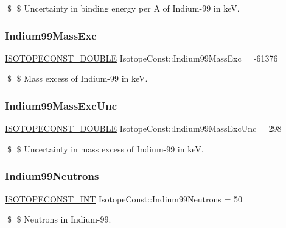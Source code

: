 \$ \$ Uncertainty in binding energy per A of Indium-\/99 in keV. \mbox{\label{group___isotope_const-_indium-_in99_ga57450335f10dbccfe2015ff966a845df}} 
\subsubsection{\texorpdfstring{Indium99\+Mass\+Exc}{Indium99MassExc}}
{\footnotesize\ttfamily \mbox{\hyperlink{group___isotope_const-_macros_ga8f45a7272ce02c0b4c65c44636ed719a}{I\+S\+O\+T\+O\+P\+E\+C\+O\+N\+S\+T\+\_\+\+D\+O\+U\+B\+LE}} Isotope\+Const\+::\+Indium99\+Mass\+Exc = -\/61376}

\$ \$ Mass excess of Indium-\/99 in keV. \mbox{\label{group___isotope_const-_indium-_in99_gac6885d9175f22d5402a070f36a38f2cb}} 
\subsubsection{\texorpdfstring{Indium99\+Mass\+Exc\+Unc}{Indium99MassExcUnc}}
{\footnotesize\ttfamily \mbox{\hyperlink{group___isotope_const-_macros_ga8f45a7272ce02c0b4c65c44636ed719a}{I\+S\+O\+T\+O\+P\+E\+C\+O\+N\+S\+T\+\_\+\+D\+O\+U\+B\+LE}} Isotope\+Const\+::\+Indium99\+Mass\+Exc\+Unc = 298}

\$ \$ Uncertainty in mass excess of Indium-\/99 in keV. \mbox{\label{group___isotope_const-_indium-_in99_ga00ea3b257e57711f87456b764e5001e2}} 
\subsubsection{\texorpdfstring{Indium99\+Neutrons}{Indium99Neutrons}}
{\footnotesize\ttfamily \mbox{\hyperlink{group___isotope_const-_macros_ga5f18360b3e99483a35c32d789e62621c}{I\+S\+O\+T\+O\+P\+E\+C\+O\+N\+S\+T\+\_\+\+I\+NT}} Isotope\+Const\+::\+Indium99\+Neutrons = 50}

\$ \$ Neutrons in Indium-\/99. \mbox{\label{group___isotope_const-_indium-_in99_ga6592c2a5f3114d9c18024f02e4d4cdd4}} 
